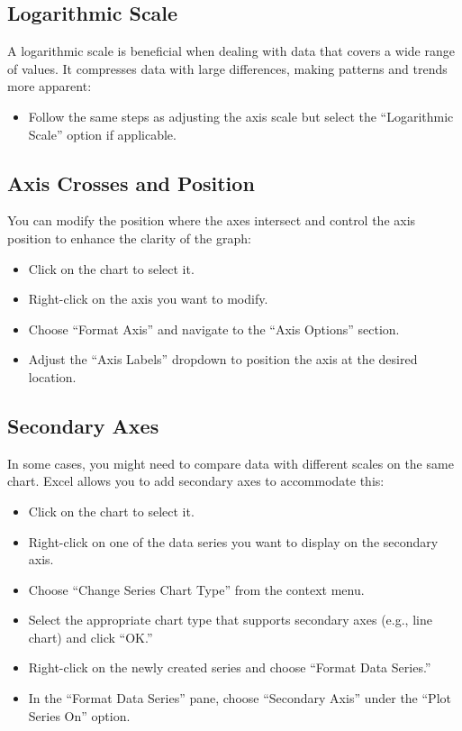 \documentclass[
]{book}
\providecommand{\tightlist}{%
  \setlength{\itemsep}{0pt}\setlength{\parskip}{0pt}}
\begin{document}
\hypertarget{logarithmic-scale}{%
\subsection{Logarithmic Scale}\label{logarithmic-scale}}

A logarithmic scale is beneficial when dealing with data that covers a wide range of values. It compresses data with large differences, making patterns and trends more apparent:

\begin{itemize}
\tightlist
\item
  Follow the same steps as adjusting the axis scale but select the ``Logarithmic Scale'' option if applicable.
\end{itemize}

\hypertarget{axis-crosses-and-position}{%
\subsection{Axis Crosses and Position}\label{axis-crosses-and-position}}

You can modify the position where the axes intersect and control the axis position to enhance the clarity of the graph:

\begin{itemize}
\tightlist
\item
  Click on the chart to select it.
\item
  Right-click on the axis you want to modify.
\item
  Choose ``Format Axis'' and navigate to the ``Axis Options'' section.
\item
  Adjust the ``Axis Labels'' dropdown to position the axis at the desired location.
\end{itemize}

\hypertarget{secondary-axes}{%
\subsection{Secondary Axes}\label{secondary-axes}}

In some cases, you might need to compare data with different scales on the same chart. Excel allows you to add secondary axes to accommodate this:

\begin{itemize}
\tightlist
\item
  Click on the chart to select it.
\item
  Right-click on one of the data series you want to display on the secondary axis.
\item
  Choose ``Change Series Chart Type'' from the context menu.
\item
  Select the appropriate chart type that supports secondary axes (e.g., line chart) and click ``OK.''
\item
  Right-click on the newly created series and choose ``Format Data Series.''
\item
  In the ``Format Data Series'' pane, choose ``Secondary Axis'' under the ``Plot Series On'' option.
\end{itemize}
\end{document}
